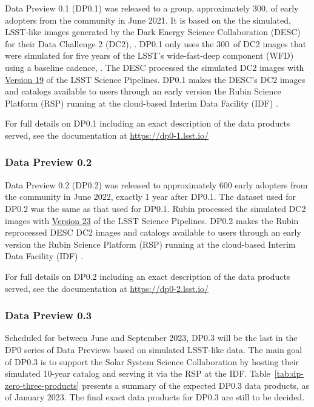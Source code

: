 Data Preview 0.1 (DP0.1) was released to a group, approximately 300,  of early adopters from the community in June 2021. 
It is based on the the simulated, LSST-like images generated by the Dark Energy Science Collaboration (DESC) for their Data Challenge 2 (DC2), \citep{2021ApJS..253...31L}. 
DP0.1 only uses the 300~\sqdeg of DC2 images that were simulated for five years of the LSST’s wide-fast-deep component (WFD) using a baseline cadence, .
The DESC processed the simulated DC2 images with \href{https://pipelines.lsst.io/v/v19_0_0/index.html}{Version 19} of the LSST Science Pipelines. 
DP0.1 makes the DESC’s DC2 images and catalogs available to users through an early version the Rubin Science Platform (RSP) running at the cloud-based Interim Data Facility (IDF) . 

For full details on DP0.1 including an exact description of the data products served, see the documentation at \url{https://dp0-1.lsst.io/}

\subsubsection{Data Preview 0.2}

Data Preview 0.2 (DP0.2) was released to approximately 600 early adopters from the community in June 2022, exactly 1 year after DP0.1. 
The dataset used for DP0.2 was the same as that used for DP0.1.
Rubin processed the simulated DC2 images with \href{https://pipelines.lsst.io/v/v23_0_0/index.html}{Version 23} of the LSST Science Pipelines. 
DP0.2 makes the Rubin reprocessed DESC DC2 images and catalogs available to users through an early version the Rubin Science Platform (RSP) running at the cloud-based Interim Data Facility (IDF) . 

For full details on DP0.2 including an exact description of the data products served, see the documentation at \url{https://dp0-2.lsst.io/}

\subsubsection{Data Preview 0.3}

Scheduled for between June and September 2023, DP0.3 will be the last in the DP0 series of Data Previews based on simulated LSST-like data. 
The main goal of DP0.3 is to support the Solar System Science Collaboration by hosting their simulated 10-year catalog and serving it via the RSP at the IDF. 
Table~\ref{tab:dp-zero-three-products} presents a summary of the expected DP0.3 data products, as of January 2023.
The final exact data products for DP0.3 are still to be decided. 

